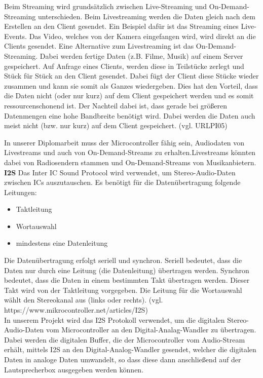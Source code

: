 \documentclass[]{article}
\begin{document}
Beim Streaming wird grundsätzlich zwischen Live-Streaming und On-Demand-Streaming unterschieden. Beim Livestreaming werden die Daten gleich nach dem Erstellen an den Client gesendet. Ein Beispiel dafür ist das Streaming eines Live-Events. Das Video, welches von der Kamera eingefangen wird, wird direkt an die Clients gesendet. Eine Alternative zum Livestreaming ist das On-Demand-Streaming. Dabei werden fertige Daten (z.B. Filme, Musik) auf einem Server gespeichert. Auf Anfrage eines Clients, werden diese in Teilstücke zerlegt und Stück für Stück an den Client gesendet. Dabei fügt der Client diese Stücke wieder zusammen und kann sie somit als Ganzes wiedergeben. Dies hat den Vorteil, dass die Daten nicht (oder nur kurz) auf dem Client gespeichert werden und es somit ressourcenschonend ist. Der Nachteil dabei ist, dass gerade bei größeren Datenmengen eine hohe Bandbreite benötigt wird. Dabei werden die Daten auch meist nicht (bzw. nur kurz) auf dem Client gespeichert. (vgl. URLPI05)

In unserer Diplomarbeit muss der Microcontroller fähig sein, Audiodaten von Livestreams und auch von On-Demand-Streams zu erhalten.Livestreams könnten dabei von Radiosendern stammen und  On-Demand-Streams von Musikanbietern. \newline \\
\textbf{I2S}
\newline
Das Inter IC Sound Protocol wird verwendet, um Stereo-Audio-Daten zwischen ICs auszutauschen. Es benötigt für die Datenübertragung folgende Leitungen:
\begin{itemize}
\item Taktleitung
\item Wortauswahl
\item mindestens eine Datenleitung
\end{itemize}
Die Datenübertragung erfolgt seriell und synchron. Seriell bedeutet, dass die Daten nur durch eine Leitung (die Datenleitung) übertragen werden. Synchron bedeutet, dass die Daten in einem bestimmten Takt übertragen werden. Dieser Takt wird von der Taktleitung vorgegeben. Die Leitung für die Wortauswahl wählt den Stereokanal aus (links oder rechts). (vgl. https://www.mikrocontroller.net/articles/I2S) \\
In unserem Projekt wird das I2S Protokoll verwendet, um die digitalen Stereo-Audio-Daten vom Microcontroller an den Digital-Analag-Wandler zu übertragen.
Dabei werden die digitalen Buffer, die der Microcontroller vom Audio-Stream erhält, mittels I2S an den Digital-Analog-Wandler gesendet, welcher die digitalen Daten in analoge Daten umwandelt, so dass diese dann anschließend auf der Lautsprecherbox ausgegeben werden können.
\end{document}
